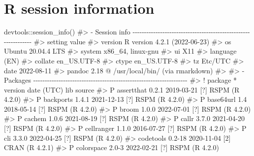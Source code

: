 \documentclass[
  11pt,
  letterpaper,
  DIV=11,
  numbers=noendperiod]{scrartcl}
\newenvironment{Shaded}{}{}
\newcommand{\CommentTok}[1]{\textcolor[rgb]{0.42,0.45,0.49}{#1}}
\newcommand{\FunctionTok}[1]{\textcolor[rgb]{0.44,0.26,0.76}{#1}}
\newcommand{\NormalTok}[1]{\textcolor[rgb]{0.14,0.16,0.18}{#1}}
\newcommand{\SpecialCharTok}[1]{\textcolor[rgb]{0.00,0.36,0.77}{#1}}
\begin{document}
\hypertarget{r-session-information}{%
\section{R session information}\label{r-session-information}}

\begin{Shaded}
\begin{Highlighting}[]
\NormalTok{devtools}\SpecialCharTok{::}\FunctionTok{session\_info}\NormalTok{()}
\CommentTok{\#\textgreater{} {-} Session info {-}{-}{-}{-}{-}{-}{-}{-}{-}{-}{-}{-}{-}{-}{-}{-}{-}{-}{-}{-}{-}{-}{-}{-}{-}{-}{-}{-}{-}{-}{-}{-}{-}{-}{-}{-}{-}{-}{-}{-}{-}{-}{-}{-}{-}{-}{-}{-}{-}{-}{-}{-}{-}{-}{-}{-}{-}{-}{-}{-}{-}{-}{-}}
\CommentTok{\#\textgreater{}  setting  value}
\CommentTok{\#\textgreater{}  version  R version 4.2.1 (2022{-}06{-}23)}
\CommentTok{\#\textgreater{}  os       Ubuntu 20.04.4 LTS}
\CommentTok{\#\textgreater{}  system   x86\_64, linux{-}gnu}
\CommentTok{\#\textgreater{}  ui       X11}
\CommentTok{\#\textgreater{}  language (EN)}
\CommentTok{\#\textgreater{}  collate  en\_US.UTF{-}8}
\CommentTok{\#\textgreater{}  ctype    en\_US.UTF{-}8}
\CommentTok{\#\textgreater{}  tz       Etc/UTC}
\CommentTok{\#\textgreater{}  date     2022{-}08{-}11}
\CommentTok{\#\textgreater{}  pandoc   2.18 @ /usr/local/bin/ (via rmarkdown)}
\CommentTok{\#\textgreater{} }
\CommentTok{\#\textgreater{} {-} Packages {-}{-}{-}{-}{-}{-}{-}{-}{-}{-}{-}{-}{-}{-}{-}{-}{-}{-}{-}{-}{-}{-}{-}{-}{-}{-}{-}{-}{-}{-}{-}{-}{-}{-}{-}{-}{-}{-}{-}{-}{-}{-}{-}{-}{-}{-}{-}{-}{-}{-}{-}{-}{-}{-}{-}{-}{-}{-}{-}{-}{-}{-}{-}{-}{-}{-}{-}}
\CommentTok{\#\textgreater{}  ! package     * version date (UTC) lib source}
\CommentTok{\#\textgreater{}  P assertthat    0.2.1   2019{-}03{-}21 [?] RSPM (R 4.2.0)}
\CommentTok{\#\textgreater{}  P backports     1.4.1   2021{-}12{-}13 [?] RSPM (R 4.2.0)}
\CommentTok{\#\textgreater{}  P base64url     1.4     2018{-}05{-}14 [?] RSPM (R 4.2.0)}
\CommentTok{\#\textgreater{}  P broom         1.0.0   2022{-}07{-}01 [?] RSPM (R 4.2.0)}
\CommentTok{\#\textgreater{}  P cachem        1.0.6   2021{-}08{-}19 [?] RSPM (R 4.2.0)}
\CommentTok{\#\textgreater{}  P callr         3.7.0   2021{-}04{-}20 [?] RSPM (R 4.2.0)}
\CommentTok{\#\textgreater{}  P cellranger    1.1.0   2016{-}07{-}27 [?] RSPM (R 4.2.0)}
\CommentTok{\#\textgreater{}  P cli           3.3.0   2022{-}04{-}25 [?] RSPM (R 4.2.0)}
\CommentTok{\#\textgreater{}    codetools     0.2{-}18  2020{-}11{-}04 [2] CRAN (R 4.2.1)}
\CommentTok{\#\textgreater{}  P colorspace    2.0{-}3   2022{-}02{-}21 [?] RSPM (R 4.2.0)}

\end{Highlighting}
\end{Shaded}
\end{document}

